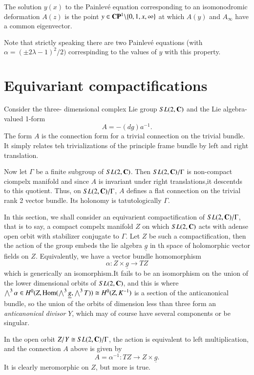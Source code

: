 \begin{proposition}\label{chap7-proposition-1}
The solution $y(x)$ to the Painlev\'e equation corresponding to an isomonodromic deformation $A(z)$ is the point $y \in \bC\bP^{1} \backslash \{ 0,1,\break x, \infty\}$ at which $A(y)$ and $A_{\infty}$ have a common eigenvector.
\end{proposition}

Note that strictly speaking there are two Painlev\'e equations (with $\alpha = (\pm 2\lambda -1)^{2}/2)$ correspinding to the values of $y$ with this property.

\section{Equivariant compactifications}\label{chap7-sec-3}

Consider the three- dimensional complex Lie group $SL(2, \mathbf{C})$ and the Lie algebra-valued 1-form
$$
A = -(dg)a^{-1}.
$$
The form $A$ is the connection form for a trivial connection on the trivial bundle. It simply relates teh trivializations of the principle frame bundle by left and right translation.

Now let $\Gamma$ be a finite subgroup of $SL(2, \mathbf{C})$. Then $SL(2, \mathbf{C})/\Gamma$ is non-compact ciompelx manifold and since $A$ is invariant under right translations,it descentds to this quotient. Thus, on $SL(2, \mathbf{C})/\Gamma$, $A$ defines a flat connection on the trivial rank 2 vector bundle. Its holonomy is tatutologically $\Gamma$.

In this section, we shall consider an equivarient compactification of $SL(2, \mathbf{C})/\Gamma$,  that is to say, a compact compelx manifold $Z$ on which $SL(2, \mathbf{C})$ acts with a\pageoriginale dense open orbit with stabilizer conjugate to $\Gamma$. Let $Z$ be such a compactification, then the action of the group embeds the lie algebra $\underline{g}$  in th space of holomorphic vector fields on $Z$. Equivalently, we have a vector bundle homomorphism
$$
\alpha: Z \times \underline{g} \rightarrow TZ
$$
which is generically an isomorphism.It fails to be an isomorphism on the union of the lower dimensional orbits of $SL(2, \mathbf{C})$, and this is where $\bigwedge^{3} \alpha \in H^{0}(Z, \operatorname{Hom}(\bigwedge^{3} \underline{g}, \bigwedge^{3}T)) \cong H^{0}(Z, K^{-1})$ is a section of the anticanonical bundle, so the union of the orbits of dimension less than three form an \textit{anticanonical divisor} $Y$, which may of course have several components or be singular.

 In the open orbit $Z/Y \cong SL(2, \mathbf{C})/\Gamma$, the action is equivalent to left multiplication, and the connection $A$ above is given by
 $$
 A = \alpha^{-1}: TZ \rightarrow  Z \times \underline{g}.
 $$
It is clearly meromorphic on $Z$, but more is true.

